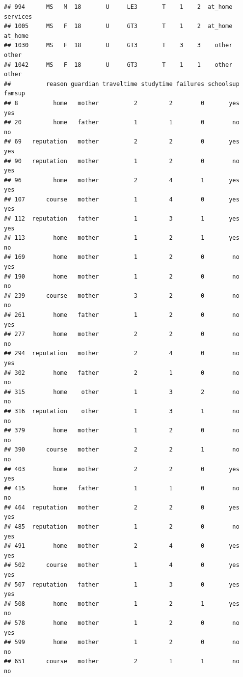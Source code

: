 \documentclass[]{article}
\begin{document}
\begin{verbatim}
## 994      MS   M  18       U     LE3       T    1    2  at_home services
## 1005     MS   F  18       U     GT3       T    1    2  at_home  at_home
## 1030     MS   F  18       U     GT3       T    3    3    other    other
## 1042     MS   F  18       U     GT3       T    1    1    other    other
##          reason guardian traveltime studytime failures schoolsup famsup
## 8          home   mother          2         2        0       yes    yes
## 20         home   father          1         1        0        no     no
## 69   reputation   mother          2         2        0       yes    yes
## 90   reputation   mother          1         2        0        no    yes
## 96         home   mother          2         4        1       yes    yes
## 107      course   mother          1         4        0       yes    yes
## 112  reputation   father          1         3        1       yes    yes
## 113        home   mother          1         2        1       yes     no
## 169        home   mother          1         2        0        no    yes
## 190        home   mother          1         2        0        no     no
## 239      course   mother          3         2        0        no     no
## 261        home   father          1         2        0        no    yes
## 277        home   mother          2         2        0        no     no
## 294  reputation   mother          2         4        0        no    yes
## 302        home   father          2         1        0        no     no
## 315        home    other          1         3        2        no     no
## 316  reputation    other          1         3        1        no     no
## 379        home   mother          1         2        0        no     no
## 390      course   mother          2         2        1        no     no
## 403        home   mother          2         2        0       yes    yes
## 415        home   father          1         1        0        no     no
## 464  reputation   mother          2         2        0       yes    yes
## 485  reputation   mother          1         2        0        no    yes
## 491        home   mother          2         4        0       yes    yes
## 502      course   mother          1         4        0       yes    yes
## 507  reputation   father          1         3        0       yes    yes
## 508        home   mother          1         2        1       yes     no
## 578        home   mother          1         2        0        no    yes
## 599        home   mother          1         2        0        no     no
## 651      course   mother          2         1        1        no     no

\end{verbatim}
\end{document}
